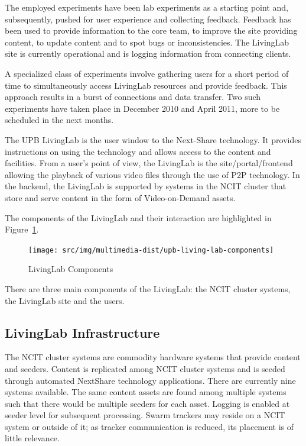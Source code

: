 The employed experiments have been lab experiments as a starting point and,
subsequently, pushed for user experience and collecting feedback. Feedback has
been used to provide information to the core team, to improve the site
providing content, to update content and to spot bugs or inconsistencies.
The LivingLab site is currently operational and is logging information from
connecting clients.

A specialized class of experiments involve gathering users for a short
period of time to simultaneously access LivingLab resources and provide
feedback. This approach results in a burst of connections and data transfer. Two such
experiments have taken place in December 2010 and April 2011, more to be
scheduled in the next months.

The UPB LivingLab is the user window to the Next-Share technology. It
provides instructions on using the technology and allows access to the content
and facilities. From a user's point of view,
the LivingLab is the site/portal/frontend allowing the playback of various video
files through the use of P2P technology. In the backend, the LivingLab is
supported by systems in the NCIT cluster that store and serve content in the
form of Video-on-Demand assets.

The components of the LivingLab and their interaction are highlighted in
Figure~\ref{fig:multimedia-dist:upb-living-lab-components}.

\begin{figure}
  \centering
  \texttt{[image: src/img/multimedia-dist/upb-living-lab-components]}
  \caption{LivingLab Components}
  \label{fig:multimedia-dist:upb-living-lab-components}
\end{figure}

There are three main components of the LivingLab: the NCIT cluster
systems, the LivingLab site and the users.

\subsection{LivingLab Infrastructure}
\label{subsec:multimedia-dist:evaluation-infrastructure}

The NCIT cluster systems are commodity hardware systems that provide content
and seeders. Content is replicated among NCIT cluster systems and is seeded
through automated NextShare technology applications. There are currently nine
systems available. The same content assets are found among multiple systems
such that there would be multiple seeders for each asset. Logging is enabled
at seeder level for subsequent processing. Swarm trackers may reside on a NCIT
system or outside of it; as tracker communication is reduced, its placement is
of little relevance.

